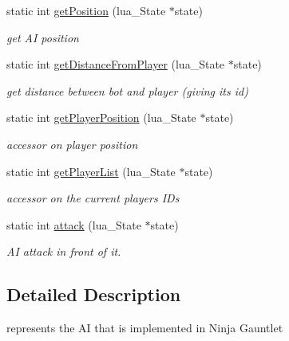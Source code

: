 \begin{DoxyCompactItemize}
\mbox{\label{classIA_a528b38ddf9f67ec6d226969360adab46}} 
static int \hyperlink{classIA_a528b38ddf9f67ec6d226969360adab46}{get\+Position} (lua\+\_\+\+State $\ast$state)
\begin{DoxyCompactList}\small\item\em get AI position \end{DoxyCompactList}\item 
\mbox{\label{classIA_aeedb20926ec98fd6f9d3686399640793}} 
static int \hyperlink{classIA_aeedb20926ec98fd6f9d3686399640793}{get\+Distance\+From\+Player} (lua\+\_\+\+State $\ast$state)
\begin{DoxyCompactList}\small\item\em get distance between bot and player (giving its id) \end{DoxyCompactList}\item 
\mbox{\label{classIA_a6044bd4c6e63449603d37b8ba3484b01}} 
static int \hyperlink{classIA_a6044bd4c6e63449603d37b8ba3484b01}{get\+Player\+Position} (lua\+\_\+\+State $\ast$state)
\begin{DoxyCompactList}\small\item\em accessor on player position \end{DoxyCompactList}\item 
\mbox{\label{classIA_a091c6a4f9655a77588c803e5f73c0ff6}} 
static int \hyperlink{classIA_a091c6a4f9655a77588c803e5f73c0ff6}{get\+Player\+List} (lua\+\_\+\+State $\ast$state)
\begin{DoxyCompactList}\small\item\em accessor on the current players I\+Ds \end{DoxyCompactList}\item 
\mbox{\label{classIA_a3c0cefad0fafba85e286b3dcc6866a18}} 
static int \hyperlink{classIA_a3c0cefad0fafba85e286b3dcc6866a18}{attack} (lua\+\_\+\+State $\ast$state)
\begin{DoxyCompactList}\small\item\em AI attack in front of it. \end{DoxyCompactList}\end{DoxyCompactItemize}


\subsection{Detailed Description}
represents the AI that is implemented in Ninja Gauntlet 

